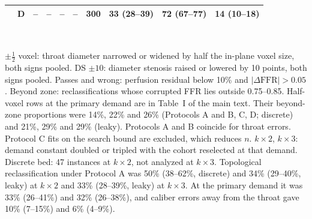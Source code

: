 \documentclass[journal,twoside,web,onecolumn]{ieeecolor}
\begin{document}
\begin{table}[!ht]
\begin{tabular}{@{}llrccc rccc@{}}
 & D & -- & -- & -- & -- & 300 & 33 (28--39) & 72 (67--77) & 14 (10--18) \\
\bottomrule
\end{tabular}
\\[3pt]
\parbox{0.95\textwidth}{\footnotesize $\pm\tfrac12$ voxel: throat diameter narrowed or widened by half the in-plane voxel size, both signs pooled. DS $\pm10$: diameter stenosis raised or lowered by 10 points, both signs pooled. Passes and wrong: perfusion residual below 10\% and $|\Delta\mathrm{FFR}| > 0.05$. Beyond zone: reclassifications whose corrupted FFR lies outside 0.75--0.85. Half-voxel rows at the primary demand are in Table~I of the main text. Their beyond-zone proportions were 14\%, 22\% and 26\% (Protocols A and B, C, D; discrete) and 21\%, 29\% and 29\% (leaky). Protocols A and B coincide for throat errors. Protocol C fits on the search bound are excluded, which reduces $n$. $k\times2$, $k\times3$: demand constant doubled or tripled with the cohort reselected at that demand. Discrete bed: 47 instances at $k\times2$, not analyzed at $k\times3$. Topological reclassification under Protocol A was 50\% (38--62\%, discrete) and 34\% (29--40\%, leaky) at $k\times2$ and 33\% (28--39\%, leaky) at $k\times3$. At the primary demand it was 33\% (26--41\%) and 32\% (26--38\%), and caliber errors away from the throat gave 10\% (7--15\%) and 6\% (4--9\%).}
\end{table}

\FloatBarrier
{}
\end{document}
